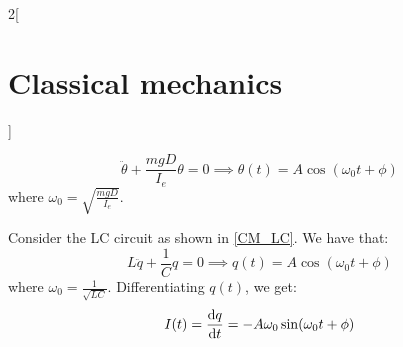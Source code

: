 \documentclass[../../../main.tex]{subfiles}
\begin{document}
\begin{multicols}{2}[\section{Classical mechanics}]
\begin{proposition}
    $$\ddot{\theta}+\frac{mgD}{I_e}\theta=0\implies\theta(t)=A\cos(\omega_0t+\phi)$$ where $\omega_0=\sqrt{\frac{mgD}{I_e}}$.
    \begin{center}
      \begin{minipage}{\linewidth}
        \centering
        
        \label{CM_fig3}
      \end{minipage}
    \end{center}
  \end{proposition}
  \begin{proposition}
    Consider the LC circuit as shown in \cref{CM_LC}. We have that:
    $$L\ddot{q}+\frac{1}{C}q=0\implies q(t)=A\cos(\omega_0t+\phi)$$ where $\omega_0=\frac{1}{\sqrt{LC}}$. Differentiating $q(t)$, we get: $$I(t)=\dv{q}{t}=-A\omega_0\sin(\omega_0t+\phi)$$
    \begin{center}
      \begin{minipage}{\linewidth}
        \centering
        
        \label{CM_LC}
      \end{minipage}
    \end{center}
  \end{proposition}

\end{multicols}
\end{document}
